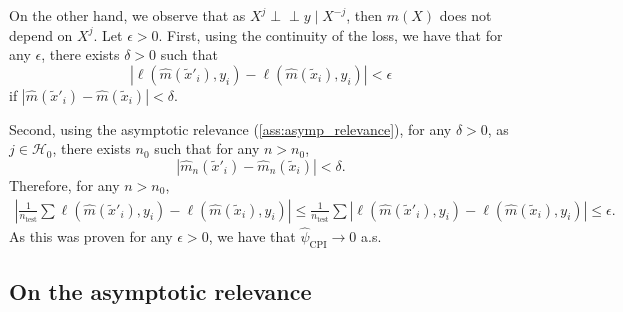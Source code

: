\documentclass{article}
\theoremstyle{plain}
\theoremstyle{definition}
\theoremstyle{remark}
\newcommand{\e}[1]{\mathbb{E}\left[#1\right]  } %
\newcommand{\indep}{\perp\!\!\!\perp}
\begin{document}
On the other hand, we observe that as $X^j\indep y\mid X^{-j}$, then $m(X)$ does not depend on $X^{j}$. Let $\epsilon>0$. First, using the continuity of the loss, we have that for any $\epsilon$, there exists $\delta>0$ such that $$|\ell(\hat{m}(\tilde{x}'_i),y_i)-\ell(\hat{m}(\tilde{x}_i),y_i)|<\epsilon$$ if $|\hat{m}(\tilde{x}'_i)-\hat{m}(\tilde{x}_i)|<\delta$.

Second, using the asymptotic relevance (\ref{ass:asymp_relevance}), for any $\delta>0$, as $j\in \mathcal{H}_0$, there exists $n_0$ such that for any $n>n_0$, $$|\hat{m}_{n}(\tilde{x}'_i)-\hat{m}_{n}(\tilde{x}_i)|<\delta.$$ Therefore, for any $n>n_0$,
\begin{align*}
    \left|\frac{1}{n_\mathrm{test}}\sum\ell(\hat{m}(\tilde{x}'_i),y_i)-\ell(\hat{m}(\tilde{x}_i),y_i)\right|\leq \frac{1}{n_\mathrm{test}}\sum|\ell(\hat{m}(\tilde{x}'_i),y_i)-\ell(\hat{m}(\tilde{x}_i),y_i)|\leq \epsilon.
\end{align*}
 As this was proven for any $\epsilon>0$, we have that $\hat{\psi}_\mathrm{CPI}\to 0$ a.s. 





\subsection{On the asymptotic relevance}\label{subsec:asympt_relev}
\end{document}
